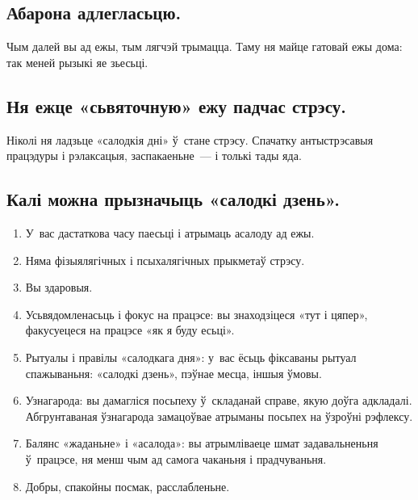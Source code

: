 
\subsection{Абарона адлегласьцю.}
Чым далей вы ад ежы, тым лягчэй трымацца. Таму ня майце гатовай ежы дома: так меней рызыкі яе зьесьці.

\subsection{Ня ежце «сьвяточную» ежу падчас стрэсу.}
Ніколі ня ладзьце «салодкія дні» ў~стане стрэсу. Спачатку антыстрэсавыя працэдуры і рэлаксацыя, заспакаеньне~--- і толькі тады яда.

\subsection{Калі можна прызначыць «салодкі дзень».}
\begin{enumerate}[itemindent=3em,labelwidth=1.5em,leftmargin=0pt,nosep]
  \item У~вас дастаткова часу паесьці і атрымаць асалоду ад ежы.
  \item Няма фізыялягічных і псыхалягічных прыкметаў стрэсу.
  \item Вы здаровыя.
  \item Усьвядомленасьць і фокус на працэсе: вы знаходзіцеся «тут і цяпер», факусуецеся на працэсе «як я буду есьці».
  \item Рытуалы і правілы «салодкага дня»: у~вас ёсьць фіксаваны рытуал спажываньня: «салодкі дзень», пэўнае месца, іншыя ўмовы.
  \item Узнагарода: вы дамагліся посьпеху ў~складанай справе, якую доўга адкладалі. Абгрунтаваная ўзнагарода замацоўвае атрыманы посьпех на ўзроўні рэфлексу.
  \item Балянс «жаданьне» і «асалода»: вы атрымліваеце шмат задавальненьня ў~працэсе, ня менш чым ад самога чаканьня і прадчуваньня.
  \item Добры, спакойны посмак, расслабленьне.
\end{enumerate}

